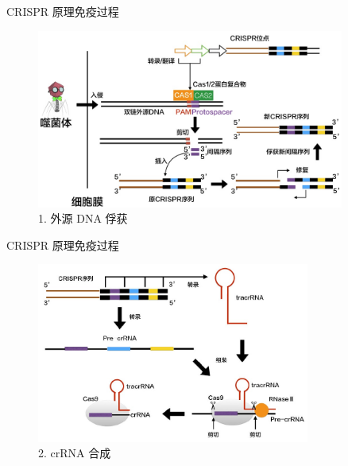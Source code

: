 \documentclass{beamer}
\begin{document}
\begin{frame}{CRISPR 原理}{免疫过程}
		
	\begin{figure}
		\centering
		\includegraphics[width=0.9\textwidth]{img/infect_stage1.jpeg}
		\caption{1. 外源 DNA 俘获}
	\end{figure}






\end{frame}


\begin{frame}{CRISPR 原理}{免疫过程}
		
	\begin{figure}
		\centering
		\includegraphics[width=0.8\textwidth]{img/infect_stage2.jpeg}
		\caption{2. crRNA 合成}
	\end{figure}


\end{frame}
\end{document}
